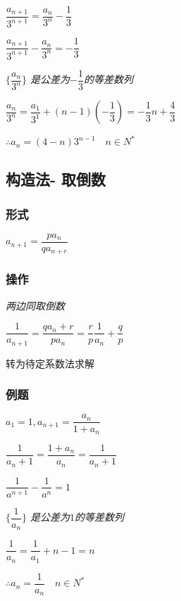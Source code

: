 \documentclass[10pt,cn]{elegantbook}
\begin{document}
\begin{tcolorbox}[colback=yellow!10!white, colframe=red!50!black]
	
	$\dfrac{a_{n+1}}{3^{n+1}}=\dfrac{a_{n}}{3^{n}}-\dfrac{1}{3}$
	
	$\dfrac{a_{n+1}}{3^{n+1}}-\dfrac{a_{n}}{3^{n}}=-\dfrac{1}{3}$
	
	
\textit{	$\{\dfrac{a_{n}}{3^{n}}\}$ 是公差为$-\dfrac{1}{3}$的等差数列}
	
   $\dfrac{a_{n}}{3^{n}}=\dfrac{a_{1}}{3^{1}}+(n-1)(-\dfrac{1}{3})=-\dfrac{1}{3}n+\dfrac{4}{3}$
	
	$\therefore a_{n}=(4-n)3^{n-1} \quad n \in N^{*}$
\end{tcolorbox}

  \subsection{构造法-	取倒数}
\subsubsection*{形式}
$a_{n+1}=\dfrac{p a_{n}}{q a_{n+r}}$

\subsubsection*{操作}

\textit{两边同取倒数}

$\dfrac{1}{a_{n+1}}=\dfrac{q a_{n}+r}{p a_{n}}=\dfrac{r}{p}\dfrac{1}{a_{n}}+\dfrac{q}{p}$

转为待定系数法求解

\subsubsection*{例题}

$a_{1}=1,a_{n+1}= \dfrac{a_{n}}{1+a_{n}}$

\begin{tcolorbox}[colback=yellow!10!white, colframe=red!50!black]
	
	$\dfrac{1}{a_{n}+1}=\dfrac{1+a_{n}}{a_{n}}=\dfrac{1}{a_{n}+1}$
	
	$\dfrac{1}{a^{n+1}}-\dfrac{1}{a^{n}}=1$
	
	
	\textit{	$\{\dfrac{1}{a_{n}}\}$ 是公差为$1$的等差数列}
	
	$\dfrac{1}{a_{n}}=\dfrac{1}{a_{1}}+n-1=n$
	
	$\therefore a_{n}=\dfrac{1}{a_{n}}\quad n \in N^{*}$
\end{tcolorbox}
\end{document}

